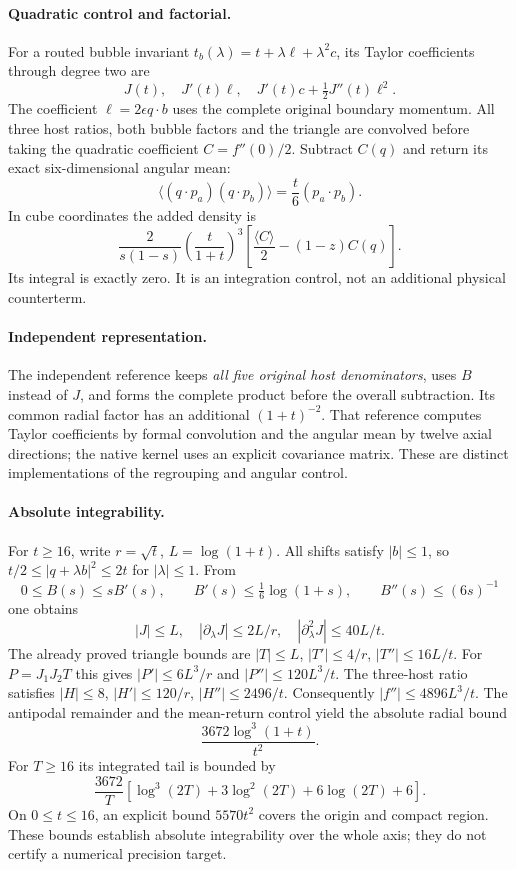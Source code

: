 \documentclass[11pt]{article}
\begin{document}
\paragraph{Quadratic control and factorial.}
For a routed bubble invariant $t_b(\lambda)=t+\lambda\ell+\lambda^2c$,
its Taylor coefficients through degree two are
\[
J(t),\quad J'(t)\ell,\quad J'(t)c+\tfrac12J''(t)\ell^2.
\]
The coefficient $\ell=2\epsilon q\cdot b$ uses the complete original boundary momentum.
All three host ratios, both bubble factors and the triangle are convolved before taking the quadratic coefficient $C=f''(0)/2$.
Subtract $C(q)$ and return its exact six-dimensional angular mean:
\[
\langle(q\cdot p_a)(q\cdot p_b)\rangle=\frac{t}{6}(p_a\cdot p_b).
\]
In cube coordinates the added density is
\[
\frac{2}{s(1-s)}\left(\frac{t}{1+t}\right)^3
\left[\frac{\langle C\rangle}{2}-(1-z)C(q)\right].
\]
Its integral is exactly zero. It is an integration control, not an additional physical counterterm.

\paragraph{Independent representation.}
The independent reference keeps \emph{all five original host denominators}, uses $B$ instead of $J$, and forms the complete product before the overall subtraction.
Its common radial factor has an additional $(1+t)^{-2}$.
That reference computes Taylor coefficients by formal convolution and the angular mean by twelve axial directions; the native kernel uses an explicit covariance matrix.
These are distinct implementations of the regrouping and angular control.

\paragraph{Absolute integrability.}
For $t\geq16$, write $r=\sqrt t$, $L=\log(1+t)$.
All shifts satisfy $|b|\leq1$, so
$t/2\leq|q+\lambda b|^2\leq2t$ for $|\lambda|\leq1$.
From
\[
0\leq B(s)\leq sB'(s),\qquad
B'(s)\leq\tfrac16\log(1+s),\qquad B''(s)\leq(6s)^{-1}
\]
one obtains
\[
|J|\leq L,\quad|\partial_\lambda J|\leq2L/r,\quad
|\partial_\lambda^2J|\leq40L/t .
\]
The already proved triangle bounds are $|T|\leq L$, $|T'|\leq4/r$, $|T''|\leq16L/t$.
For $P=J_1J_2T$ this gives $|P'|\leq6L^3/r$ and $|P''|\leq120L^3/t$.
The three-host ratio satisfies
$|H|\leq8$, $|H'|\leq120/r$, $|H''|\leq2496/t$.
Consequently $|f''|\leq4896L^3/t$.
The antipodal remainder and the mean-return control yield the absolute radial bound
\[
\frac{3672\log^3(1+t)}{t^2}.
\]
For $T\geq16$ its integrated tail is bounded by
\[
\frac{3672}{T}\left[\log^3(2T)+3\log^2(2T)+6\log(2T)+6\right].
\]
On $0\leq t\leq16$, an explicit bound $5570t^2$ covers the origin and compact region.
These bounds establish absolute integrability over the whole axis; they do not certify a numerical precision target.
\end{document}

